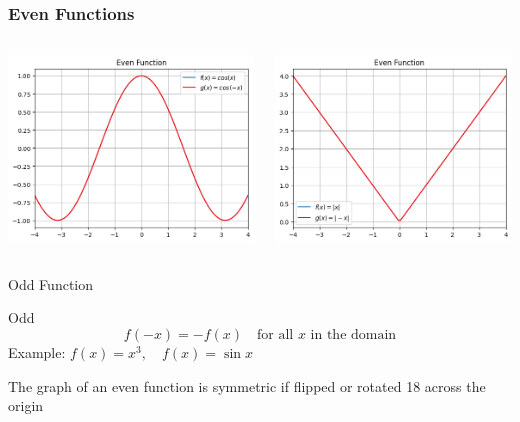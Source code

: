 \documentclass{beamer}
\begin{document}
\begin{frame}
  \frametitle{Even Functions}
  \begin{columns}
    \includegraphics[width=\linewidth]{even.png}

    \centering
    \includegraphics[width=\linewidth]{even2.png}
\end{columns}
\end{frame}
\begin{frame}{Odd Function}
\begin{block}{Odd}
        \[
        f(-x) = -f(x) \quad \text{for all } x \text{ in the domain}
        \]
        Example: \( f(x) = x^3, \quad f(x) = \sin x \)
\end{block}
The graph of an even function is symmetric if flipped or rotated 18 across the origin 
\end{frame}
\end{document}
